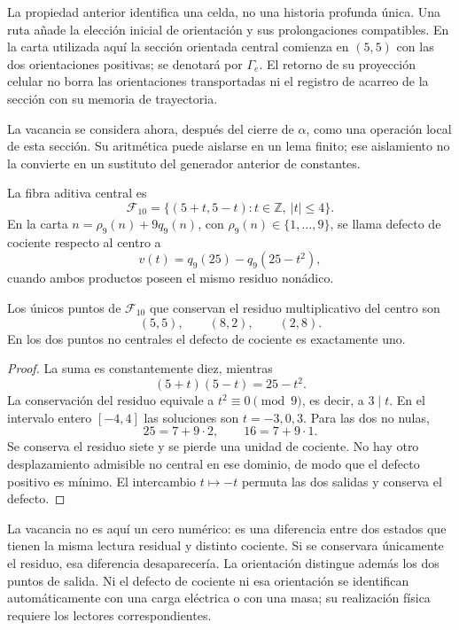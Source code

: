 La propiedad anterior identifica una celda, no una historia profunda
única. Una ruta añade la elección inicial de orientación y sus
prolongaciones compatibles. En la carta utilizada aquí la sección
orientada central comienza en \((5,5)\) con las dos orientaciones
positivas; se denotará por \(\Gamma_e\). El retorno de su proyección
celular no borra las orientaciones transportadas ni el registro de
acarreo de la sección con su memoria de trayectoria.

La vacancia se considera ahora, después del cierre de \(\alpha\), como
una operación local de esta sección. Su aritmética puede aislarse en un
lema finito; ese aislamiento no la convierte en un sustituto del
generador anterior de constantes.

\begin{definition}
La fibra aditiva central es
\[
 \mathcal F_{10}
 =\{(5+t,5-t):t\in\mathbb Z,\ |t|\leq4\}.
\]
En la carta \(n=\rho_9(n)+9q_9(n)\), con
\(\rho_9(n)\in\{1,\ldots,9\}\), se llama defecto de cociente respecto
al centro a
\[
 v(t)=q_9(25)-q_9(25-t^2),
\]
cuando ambos productos poseen el mismo residuo nonádico.
\end{definition}

\begin{lemma}
Los únicos puntos de \(\mathcal F_{10}\) que conservan el residuo
multiplicativo del centro son
\[
 (5,5),\qquad (8,2),\qquad (2,8).
\]
En los dos puntos no centrales el defecto de cociente es exactamente uno.
\end{lemma}
\begin{proof}
La suma es constantemente diez, mientras
\[
 (5+t)(5-t)=25-t^2.
\]
La conservación del residuo equivale a \(t^2\equiv0\pmod9\), es decir,
a \(3\mid t\). En el intervalo entero \([-4,4]\) las soluciones son
\(t=-3,0,3\). Para las dos no nulas,
\[
 25=7+9\cdot2,\qquad16=7+9\cdot1.
\]
Se conserva el residuo siete y se pierde una unidad de cociente. No hay
otro desplazamiento admisible no central en ese dominio, de modo que el
defecto positivo es mínimo. El intercambio \(t\mapsto-t\) permuta las
dos salidas y conserva el defecto.
\end{proof}

La vacancia no es aquí un cero numérico: es una diferencia entre dos
estados que tienen la misma lectura residual y distinto cociente. Si se
conservara únicamente el residuo, esa diferencia desaparecería. La
orientación distingue además los dos puntos de salida. Ni el defecto de
cociente ni esa orientación se identifican automáticamente con una carga
eléctrica o con una masa; su realización física requiere los lectores
correspondientes.


